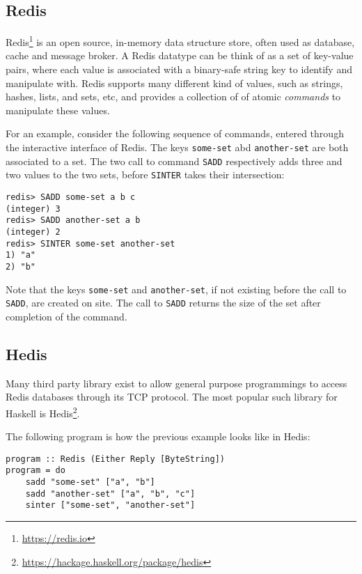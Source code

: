 \documentclass[pldi]{sigplanconf-pldi16}
\begin{document}
\subsection{Redis}

Redis\footnote{\url{https://redis.io}} is an open source, in-memory data structure store, often used as
database, cache and message broker. A Redis datatype can be think of as a set of key-value pairs, where each value is associated with a binary-safe string key to identify and manipulate with. Redis supports many different kind of values, such as strings, hashes, lists, and sets, etc, and provides a collection of of atomic \emph{commands} to manipulate these values.

For an example, consider the following sequence of commands, entered through the interactive interface of Redis. The keys
\texttt{some-set} abd \texttt{another-set} are
both associated to a set. The two call to command \texttt{SADD} respectively adds three and two values to the two sets, before \texttt{SINTER} takes their intersection:
\begin{verbatim}
redis> SADD some-set a b c
(integer) 3
redis> SADD another-set a b
(integer) 2
redis> SINTER some-set another-set
1) "a"
2) "b"
\end{verbatim}

Note that the keys \texttt{some-set} and \texttt{another-set}, if not existing before the call to \texttt{SADD}, are created on site. The call to
\texttt{SADD} returns the size of the set after
completion of the command.

\subsection{Hedis}

Many third party library exist to allow general purpose programmings
to access Redis databases through its TCP protocol. The most popular
such library for Haskell is Hedis\footnote{\url{https://hackage.haskell.org/package/hedis}}.

The following program is how the previous example looks like in
Hedis:

\begin{verbatim}
program :: Redis (Either Reply [ByteString])
program = do
    sadd "some-set" ["a", "b"]
    sadd "another-set" ["a", "b", "c"]
    sinter ["some-set", "another-set"]
\end{verbatim}
\end{document}
